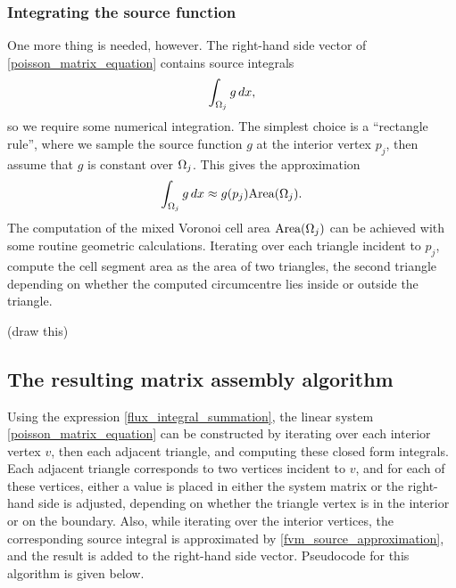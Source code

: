 \subsubsection{Integrating the source function}
One more thing is needed, however. The right-hand side vector of \eqref{poisson_matrix_equation} contains source integrals
    $$\int_{{\Omega}_j}g\,dx,$$
so we require some numerical integration.
The simplest choice is a ``rectangle rule'', where we sample the source function $g$ at the interior vertex
$p_j$, then assume that $g$ is constant over ${\Omega}_j$. This gives the approximation
\begin{equation}\label{fvm_source_approximation}
    \int_{{\Omega}_j}g\,dx \approx g(p_j)\text{Area}({\Omega}_j).
\end{equation}
The computation of the mixed Voronoi cell area $\text{Area}({\Omega}_j)$ can be achieved with some routine geometric calculations.
Iterating over each triangle incident to $p_j$, compute the cell segment area as the area of two triangles, the second triangle depending on whether
the computed circumcentre lies inside or outside the triangle.

\vskip 0.2in
(draw this)
\vskip 0.2in

\subsection{The resulting matrix assembly algorithm}
Using the expression \eqref{flux_integral_summation}, the linear system
\eqref{poisson_matrix_equation} can be constructed by iterating over each interior vertex $v$, then each adjacent triangle,
and computing these closed form integrals.
Each adjacent triangle corresponds to two vertices incident to $v$, and for each of these vertices,
either a value is placed in either the system matrix or the right-hand side is adjusted,
depending on whether the triangle vertex is in the interior or on the boundary. Also, while iterating over the interior vertices,
the corresponding source integral is approximated by \eqref{fvm_source_approximation}, and the result is added to the right-hand side vector.
Pseudocode for this algorithm is given below.


\newcommand{\poissonfvmmatrixassembly}{Poisson\_FVM\_Matrix\_Assembly}

